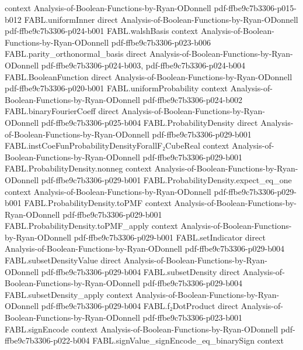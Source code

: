 \begin{theorem}
  {context}
  {Analysis-of-Boolean-Functions-by-Ryan-ODonnell}
  {pdf-ffbe9c7b3306-p015-b012}
\proofstep
  {FABL.uniformInner}
  {direct}
  {Analysis-of-Boolean-Functions-by-Ryan-ODonnell}
  {pdf-ffbe9c7b3306-p024-b001}
\proofstep
  {FABL.walshBasis}
  {context}
  {Analysis-of-Boolean-Functions-by-Ryan-ODonnell}
  {pdf-ffbe9c7b3306-p023-b006}
\proofstep
  {FABL.parity_orthonormal_basis}
  {direct}
  {Analysis-of-Boolean-Functions-by-Ryan-ODonnell}
  {pdf-ffbe9c7b3306-p024-b003,
    pdf-ffbe9c7b3306-p024-b004}
\proofstep
  {FABL.BooleanFunction}
  {direct}
  {Analysis-of-Boolean-Functions-by-Ryan-ODonnell}
  {pdf-ffbe9c7b3306-p020-b001}
\proofstep
  {FABL.uniformProbability}
  {context}
  {Analysis-of-Boolean-Functions-by-Ryan-ODonnell}
  {pdf-ffbe9c7b3306-p024-b002}
\proofstep
  {FABL.binaryFourierCoeff}
  {direct}
  {Analysis-of-Boolean-Functions-by-Ryan-ODonnell}
  {pdf-ffbe9c7b3306-p025-b004}
\proofstep
  {FABL.ProbabilityDensity}
  {direct}
  {Analysis-of-Boolean-Functions-by-Ryan-ODonnell}
  {pdf-ffbe9c7b3306-p029-b001}
\proofstep
  {FABL.instCoeFunProbabilityDensityForallF₂CubeReal}
  {context}
  {Analysis-of-Boolean-Functions-by-Ryan-ODonnell}
  {pdf-ffbe9c7b3306-p029-b001}
\proofstep
  {FABL.ProbabilityDensity.nonneg}
  {context}
  {Analysis-of-Boolean-Functions-by-Ryan-ODonnell}
  {pdf-ffbe9c7b3306-p029-b001}
\proofstep
  {FABL.ProbabilityDensity.expect_eq_one}
  {context}
  {Analysis-of-Boolean-Functions-by-Ryan-ODonnell}
  {pdf-ffbe9c7b3306-p029-b001}
\proofstep
  {FABL.ProbabilityDensity.toPMF}
  {context}
  {Analysis-of-Boolean-Functions-by-Ryan-ODonnell}
  {pdf-ffbe9c7b3306-p029-b001}
\proofstep
  {FABL.ProbabilityDensity.toPMF_apply}
  {context}
  {Analysis-of-Boolean-Functions-by-Ryan-ODonnell}
  {pdf-ffbe9c7b3306-p029-b001}
\proofstep
  {FABL.setIndicator}
  {direct}
  {Analysis-of-Boolean-Functions-by-Ryan-ODonnell}
  {pdf-ffbe9c7b3306-p029-b004}
\proofstep
  {FABL.subsetDensityValue}
  {direct}
  {Analysis-of-Boolean-Functions-by-Ryan-ODonnell}
  {pdf-ffbe9c7b3306-p029-b004}
\proofstep
  {FABL.subsetDensity}
  {direct}
  {Analysis-of-Boolean-Functions-by-Ryan-ODonnell}
  {pdf-ffbe9c7b3306-p029-b004}
\proofstep
  {FABL.subsetDensity_apply}
  {context}
  {Analysis-of-Boolean-Functions-by-Ryan-ODonnell}
  {pdf-ffbe9c7b3306-p029-b004}
\proofstep
  {FABL.f₂DotProduct}
  {direct}
  {Analysis-of-Boolean-Functions-by-Ryan-ODonnell}
  {pdf-ffbe9c7b3306-p023-b001}
\proofstep
  {FABL.signEncode}
  {context}
  {Analysis-of-Boolean-Functions-by-Ryan-ODonnell}
  {pdf-ffbe9c7b3306-p022-b004}
\proofstep
  {FABL.signValue_signEncode_eq_binarySign}
  {context}

\end{theorem}
